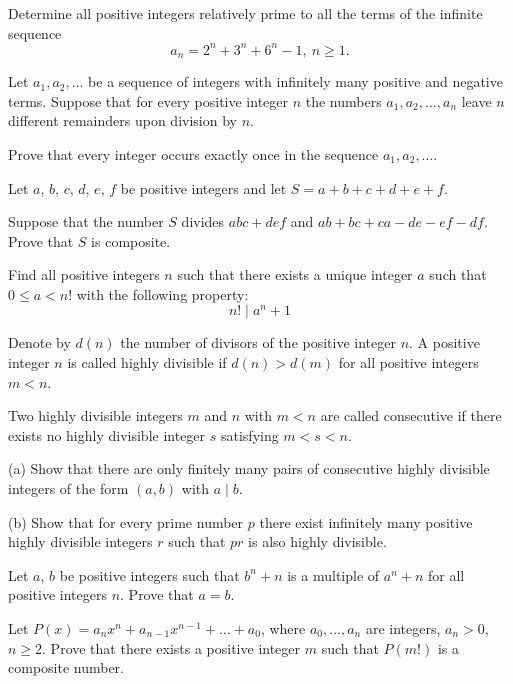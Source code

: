 \item[\textbf{N1.}]
Determine all positive integers relatively prime to all the terms of the infinite sequence 
\[ a_n=2^n+3^n+6^n -1,\ n\geq 1. \]

\item[\textbf{N2.}]
Let 
$a_1,a_2,\ldots$
 be a sequence of integers with infinitely many positive and negative terms. Suppose that for every positive integer 
$n$
 the numbers 
$a_1,a_2,\ldots,a_n$
 leave 
$n$
 different remainders upon division by 
$n$.

Prove that every integer occurs exactly once in the sequence 
$a_1,a_2,\ldots$.

\item[\textbf{N3.}]
Let 
$ a$, 
$ b$, 
$ c$, 
$ d$, 
$ e$, 
$ f$
 be positive integers and let 
$ S = a+b+c+d+e+f$.


Suppose that the number 
$ S$
 divides 
$ abc+def$
 and  
$ ab+bc+ca-de-ef-df$.
 Prove that 
$ S$
 is composite.

\item[\textbf{N4.}]
Find all positive integers 
$ n$
 such that there exists a unique integer 
$ a$
 such that 
$ 0\leq a < n!$
 with the following property:
\[ n!\mid a^n + 1
\]

\item[\textbf{N5.}]
Denote by 
$d(n)$
 the number of divisors of the positive integer 
$n$.
 A positive integer 
$n$
 is called highly divisible if 
$d(n) > d(m)$
 for all positive integers 
$m < n$.


Two highly divisible integers 
$m$
 and 
$n$
 with 
$m < n$
 are called consecutive if there exists no highly divisible integer 
$s$
 satisfying 
$m < s < n$.


(a) Show that there are only finitely many pairs of consecutive highly divisible
integers of the form 
$(a, b)$
 with 
$a\mid b$.


(b) Show that for every prime number 
$p$
 there exist infinitely many positive highly divisible integers 
$r$
 such that 
$pr$
 is also highly divisible.

\item[\textbf{N6.}]
Let 
$a$, 
$b$
 be positive integers such that 
$b^n+n$
 is a multiple of 
$a^n+n$
 for all positive integers 
$n$.
 Prove that 
$a=b$.

\item[\textbf{N7.}]
Let 
$P(x)=a_{n}x^{n}+a_{n-1}x^{n-1}+\ldots+a_{0}$, 
 where 
$a_{0},\ldots,a_{n}$
 are integers, 
$a_{n}>0$, 
$n\geq 2$.
 Prove that there exists a positive integer 
$m$
 such that 
$P(m!)$
 is a composite number.